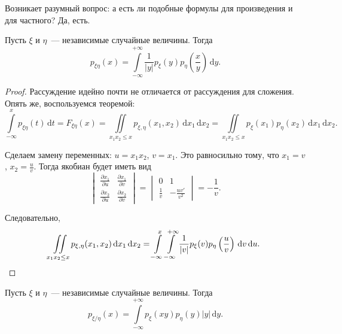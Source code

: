 Возникает разумный вопрос: а есть ли подобные формулы для произведения и для частного? Да, есть. 
\begin{lemma}
	Пусть \(\xi\) и \(\eta\)~--- независимые случайные величины. Тогда
	\[p_{\xi\eta}(x) = \int\limits_{-\infty}^{+\infty} \frac{1}{|y|} p_{\xi}(y)p_{\eta}\left(\frac{x}{y}\right)\,\mathrm{d}y.\]
\end{lemma}
\begin{proof}
	Рассуждение идейно почти не отличается от рассуждения для сложения. Опять же, воспользуемся теоремой:
	\[\int\limits_{-\infty}^{x} p_{\xi\eta}(t)\,\mathrm{d}t = F_{\xi\eta}(x) =  \iint\limits_{x_{1}x_{2} \leq x} p_{\xi, \eta}(x_1, x_2)\,\mathrm{d}x_1\,\mathrm{d}x_2 = \iint\limits_{x_{1}x_{2} \leq x} p_{\xi}(x_1)p_{\eta}(x_2)\,\mathrm{d}x_1\,\mathrm{d}x_2.\]
	
	Сделаем замену переменных: \(u = x_1 x_2\), \(v = x_1\). Это равносильно тому, что \(x_1 = v\), \(x_2 = \frac{u}{v}\). Тогда якобиан будет иметь вид
	\[
	\begin{vmatrix}
	\frac{\partial x_1}{\partial u} & \frac{\partial x_1}{\partial v} \\[0.3em]
	\frac{\partial x_2}{\partial u} & \frac{\partial x_2}{\partial v}
	\end{vmatrix}
	=
	\begin{vmatrix}
	0 & 1 \\[0.3em]
	\frac{1}{v} & -\frac{uv'}{v^2}
	\end{vmatrix}
	= -\frac{1}{v}.
	\]
	
	Следовательно,
	\[\iint\limits_{x_{1}x_{2} \leq x} p_{\xi, \eta}(x_1, x_2)\,\mathrm{d}x_1\,\mathrm{d}x_2 = \int\limits_{-\infty}^{x} \int\limits_{-\infty}^{+\infty} \frac{1}{|v|} p_{\xi}(v)p_{\eta}\left(\frac{u}{v}\right)\,\mathrm{d}v\,\mathrm{d}u.\qedhere\]
\end{proof}
\begin{lemma}
	Пусть \(\xi\) и \(\eta\)~--- независимые случайные величины. Тогда
	\[p_{\xi/\eta}(x) = \int\limits_{-\infty}^{+\infty}p_{\xi}(xy)p_{\eta}(y)|y|\,\mathrm{d}y.\]
\end{lemma}
